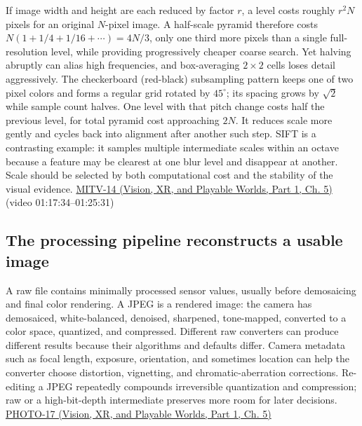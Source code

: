 If image width and height are each reduced by factor \(r\), a level costs roughly \(r^2N\) pixels for an original \(N\)-pixel image. A half-scale pyramid therefore costs \(N(1+1/4+1/16+\cdots)=4N/3\), only one third more pixels than a single full-resolution level, while providing progressively cheaper coarse search. Yet halving abruptly can alias high frequencies, and box-averaging \(2\times2\) cells loses detail aggressively. The checkerboard (red-black) subsampling pattern keeps one of two pixel colors and forms a regular grid rotated by \(45^\circ\); its spacing grows by \(\sqrt2\) while sample count halves. One level with that pitch change costs half the previous level, for total pyramid cost approaching \(2N\). It reduces scale more gently and cycles back into alignment after another such step. SIFT is a contrasting example: it samples multiple intermediate scales within an octave because a feature may be clearest at one blur level and disappear at another. Scale should be selected by both computational cost and the stability of the visual evidence. \href{../07-Vision-XR-and-Playable-Worlds-P01/main.pdf\#nameddest=04-visual-computing-ii-ch036-mitv-14---inspection-in-patquick-hough-transform-homography-position-determination-multi-scale}{MITV-14 (Vision, XR, and Playable Worlds, Part 1, Ch. 5)} (video 01:17:34--01:25:31)

\subsection{The processing pipeline reconstructs a usable image}\label{03-visual-computing-i-ch004-the-processing-pipeline-reconstructs-a-usable-image}

\hypertarget{03-visual-computing-i-ch004-the-processing-pipeline-reconstructs-a-usable-image}{}

A raw file contains minimally processed sensor values, usually before demosaicing and final color rendering. A JPEG is a rendered image: the camera has demosaiced, white-balanced, denoised, sharpened, tone-mapped, converted to a color space, quantized, and compressed. Different raw converters can produce different results because their algorithms and defaults differ. Camera metadata such as focal length, exposure, orientation, and sometimes location can help the converter choose distortion, vignetting, and chromatic-aberration corrections. Re-editing a JPEG repeatedly compounds irreversible quantization and compression; raw or a high-bit-depth intermediate preserves more room for later decisions. \href{../07-Vision-XR-and-Playable-Worlds-P01/main.pdf\#nameddest=04-visual-computing-ii-ch036-photo-17---photography-session-17}{PHOTO-17 (Vision, XR, and Playable Worlds, Part 1, Ch. 5)}

